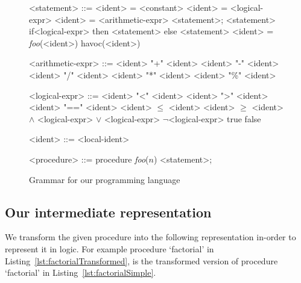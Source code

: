 \documentclass{llncs}
\newcommand{\foo}{\textit{foo}}
\newcommand{\n}{\textit{n}}
\begin{document}
\begin{figure}[hb!]
  \begin{grammar}
    <statement> ::= <ident> = <constant>
    \alt <ident> = <logical-expr>
    \alt <ident> = <arithmetic-expr>
    \alt <statement>; <statement>
    \alt if<logical-expr> then <statement> else <statement>
    \alt <ident> = \foo(<ident>)
    \alt havoc(<ident>)


    <arithmetic-expr> ::= <ident> "+" <ident>
    \alt <ident> "-" <ident>
    \alt <ident> "/" <ident>
    \alt <ident> "*" <ident>
    \alt <ident> "\%" <ident>
 
    <logical-expr> ::= <ident> "<" <ident>
    \alt <ident> ">" <ident>
    \alt <ident> "==" <ident>
    \alt <ident> $\leq$ <ident>
    \alt <ident> $\geq$ <ident>
     $\wedge$ <logical-expr>
     $\vee$ <logical-expr>
    \alt $\neg$<logical-expr>
    \alt true
    \alt false

    <ident> ::= <local-ident>
    
    <procedure> ::= procedure \foo ($\n$) {<statement>;}
  \end{grammar}
  \caption{Grammar for our programming language}
  \label{fig:grammar}
\end{figure}

\subsection{Our intermediate representation}\label{sec:intermediate}
We transform the given procedure into the following representation
in-order to represent it in logic. For example procedure `factorial'
in Listing~\ref{lst:factorialTransformed}, is the transformed version
of procedure `factorial' in Listing~\ref{lst:factorialSimple}.
\end{document}
